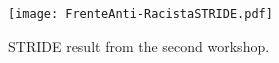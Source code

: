 
%

\begin{figure}
    \centering
    \texttt{[image: FrenteAnti-RacistaSTRIDE.pdf]}
    \caption{STRIDE result from the second workshop.}
    \label{fig:STRIDE_workshop2}
\end{figure}